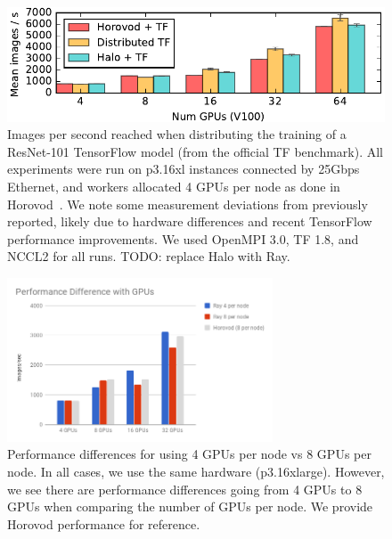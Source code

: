 \begin{figure}
    \centering
    \includegraphics{fig/sgd_plot.pdf}
    \caption{
    \small{
        Images per second reached when distributing the training of a
        ResNet-101 TensorFlow model (from the official TF benchmark).
        All experiments were run on p3.16xl instances connected by 25Gbps Ethernet, and
        workers allocated 4 GPUs per node as done in Horovod~\cite{horovod}.
        We note some measurement deviations from previously reported, likely
        due to hardware differences and
        recent TensorFlow performance improvements. We used
        OpenMPI 3.0, TF 1.8, and NCCL2 for all runs.
        {\color{red} TODO: replace Halo with Ray.}
    }
    }
    \label{fig:sgd}
\end{figure}

\begin{figure}
    \centering
    \includegraphics[width=3.1in,keepaspectratio]{fig/4to8.png}
    \caption{
    \small{
        Performance differences for using 4 GPUs per node vs 8 GPUs per node. In all cases, we use the same hardware (p3.16xlarge). However, we see there are performance differences going from 4 GPUs to 8 GPUs when comparing the number of GPUs per node. We provide Horovod performance for reference.
    }
    }
    \label{fig:8-vs-4-gpu}
\end{figure}

